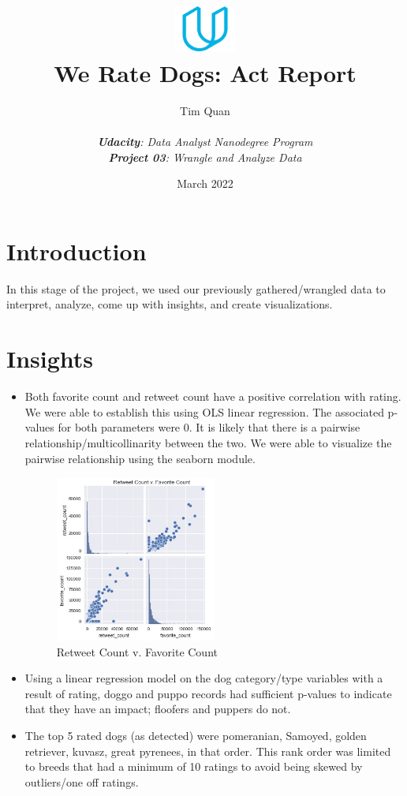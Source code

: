 \documentclass[10pt,a4paper]{article}
\title{\includegraphics[width=2cm]{udacity-logo.png}\\We Rate Dogs: Act Report}
\date{March 2022}
\author{Tim Quan\\ \\ 
	\textit{\textbf{Udacity}: Data Analyst Nanodegree Program}\\ 
	\textit{\textbf{Project 03}: Wrangle and Analyze Data}}
\begin{document}
\maketitle

\section{Introduction}

    In this stage of the project, we used our previously gathered/wrangled data to interpret, analyze, come up with insights,
    and create visualizations.

    \section{Insights}
        \begin{itemize}

            \item Both favorite count and retweet count have a positive correlation with rating. We were able to establish this using OLS linear regression. 
            The associated p-values for both parameters were 0. It is likely that there is a pairwise relationship/multicollinarity between the two. We
            were able to visualize the pairwise relationship using the seaborn module.
            \begin{figure}[htb]
                \centering
                \includegraphics[width=0.5\textwidth]{pairwise.jpg}            
                \caption{Retweet Count v. Favorite Count}
              \end{figure}
            \item Using a linear regression model on the dog category/type variables with a result of rating, doggo and puppo records had sufficient p-values to indicate that they have an impact; floofers and puppers do not.            
            \item The top 5 rated dogs (as detected) were pomeranian, Samoyed, golden retriever, kuvasz, great pyrenees, in that order. This rank order was limited to 
            breeds that had a minimum of 10 ratings to avoid being skewed by outliers/one off ratings.
        \end{itemize}
\end{document}
